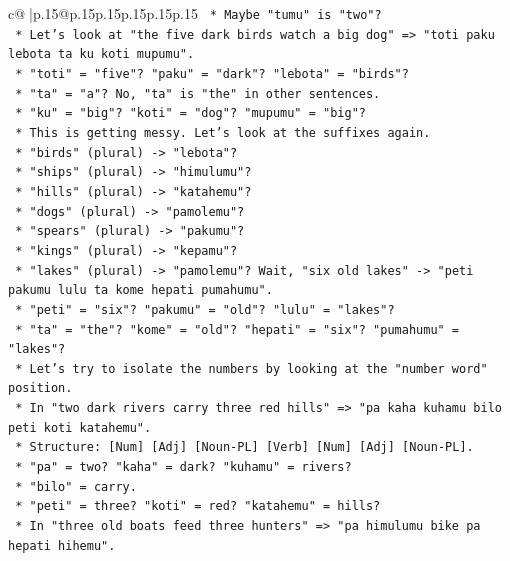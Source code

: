 \documentclass{article}
\begin{document}
{\begin{supertabular}{c@{$\;$}|p{.15\linewidth}@{}p{.15\linewidth}p{.15\linewidth}p{.15\linewidth}p{.15\linewidth}p{.15\linewidth}}
{{{\texttt{        *   Maybe "tumu" is "two"?} \\
\texttt{        *   Let's look at "the five dark birds watch a big dog" => "toti paku lebota ta ku koti mupumu".} \\
\texttt{            *   "toti" = "five"? "paku" = "dark"? "lebota" = "birds"?} \\
\texttt{            *   "ta" = "a"? No, "ta" is "the" in other sentences.} \\
\texttt{            *   "ku" = "big"? "koti" = "dog"? "mupumu" = "big"?} \\
\texttt{        *   This is getting messy. Let's look at the suffixes again.} \\
\texttt{        *   "birds" (plural) {-}> "lebota"?} \\
\texttt{        *   "ships" (plural) {-}> "himulumu"?} \\
\texttt{        *   "hills" (plural) {-}> "katahemu"?} \\
\texttt{        *   "dogs" (plural) {-}> "pamolemu"?} \\
\texttt{        *   "spears" (plural) {-}> "pakumu"?} \\
\texttt{        *   "kings" (plural) {-}> "kepamu"?} \\
\texttt{        *   "lakes" (plural) {-}> "pamolemu"? Wait, "six old lakes" {-}> "peti pakumu lulu ta kome hepati pumahumu".} \\
\texttt{            *   "peti" = "six"? "pakumu" = "old"? "lulu" = "lakes"?} \\
\texttt{            *   "ta" = "the"? "kome" = "old"? "hepati" = "six"? "pumahumu" = "lakes"?} \\
\texttt{        *   Let's try to isolate the numbers by looking at the "number word" position.} \\
\texttt{        *   In "two dark rivers carry three red hills" => "pa kaha kuhamu bilo peti koti katahemu".} \\
\texttt{            *   Structure: {[}Num{]} {[}Adj{]} {[}Noun{-}PL{]} {[}Verb{]} {[}Num{]} {[}Adj{]} {[}Noun{-}PL{]}.} \\
\texttt{            *   "pa" = two? "kaha" = dark? "kuhamu" = rivers?} \\
\texttt{            *   "bilo" = carry.} \\
\texttt{            *   "peti" = three? "koti" = red? "katahemu" = hills?} \\
\texttt{        *   In "three old boats feed three hunters" => "pa himulumu bike pa hepati hihemu".} \\
}}}
\end{supertabular}}
\end{document}
